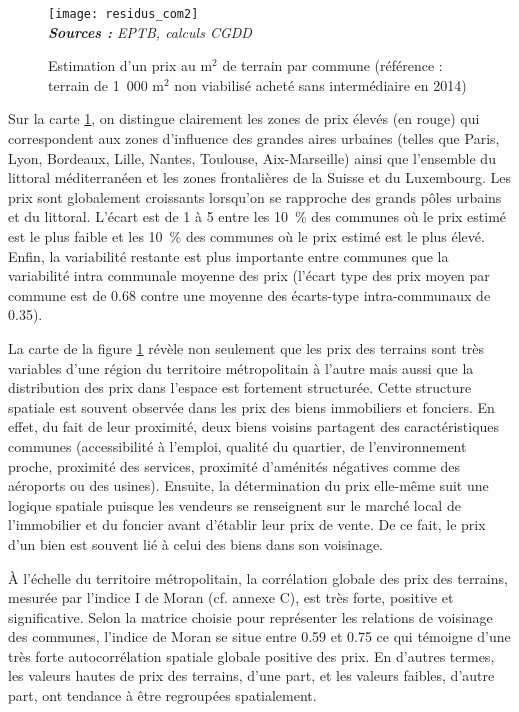 \documentclass[10.5pt,a4paper]{article}
\begin{document}
{%
\begin{figure}[!h]%
\caption{Estimation d'un prix au m$^2$ de terrain par commune (référence : terrain de 1~000 m$^2$ non viabilisé acheté sans intermédiaire en 2014)}%
\texttt{[image: residus\_com2]} \\
\label{prix_com_2014}%
\scriptsize \textit{\textbf{Sources :} EPTB, calculs CGDD}
\end{figure}

Sur la carte \ref{prix_com_2014}, on distingue clairement les zones de prix élevés (en rouge) qui correspondent aux zones d'influence des grandes aires urbaines (telles que Paris, Lyon, Bordeaux, Lille, Nantes, Toulouse, Aix-Marseille) ainsi que l'ensemble du littoral méditerranéen et les zones frontalières de la Suisse et du Luxembourg. Les prix sont globalement croissants lorsqu'on se rapproche des grands pôles urbains et du littoral. L'écart est de 1 à 5 entre les 10~\% des communes où le prix estimé est le plus faible et les 10~\% des communes où le prix estimé est le plus élevé. Enfin, la variabilité restante est plus importante entre communes que la variabilité intra communale moyenne des prix (l'écart type des prix moyen par commune est de 0.68  contre une moyenne des écarts-type intra-communaux de 0.35). \par  

La carte de la figure \ref{prix_com_2014} révèle non seulement que les prix des terrains sont très variables d'une région du territoire métropolitain à l'autre mais aussi que la distribution des prix dans l'espace est fortement structurée. Cette structure spatiale est souvent observée dans les prix des biens immobiliers et fonciers. En effet, du fait de leur proximité, deux biens voisins partagent des caractéristiques communes (accessibilité à l'emploi, qualité du quartier, de l'environnement proche, proximité des services, proximité d'aménités négatives comme des aéroports ou des usines). Ensuite, la détermination du prix elle-même suit une logique spatiale puisque les vendeurs se renseignent sur le marché local de l'immobilier et du foncier avant d'établir leur prix de vente. De ce fait, le prix d'un bien est souvent lié à celui des biens dans son voisinage.\par   

\`{A} l'échelle du territoire métropolitain, la corrélation globale des prix des terrains, mesurée par l'indice I de Moran (cf. annexe C), est très forte, positive et significative. Selon la matrice choisie pour représenter les relations de voisinage des communes, l'indice de Moran se situe entre 0.59 et 0.75 ce qui témoigne d'une très forte autocorrélation spatiale globale positive des prix. En d'autres termes, les valeurs hautes de prix des terrains, d'une part, et les valeurs faibles, d'autre part, ont tendance à être regroupées spatialement. \par     

}
\end{document}
